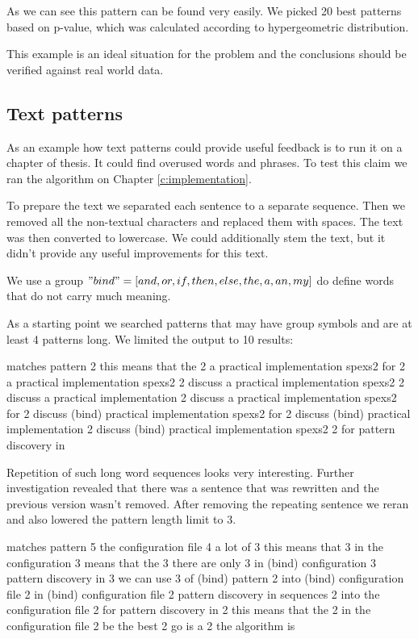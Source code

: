 As we can see this  pattern can be found very easily. We picked 20 best patterns based on p-value, which was calculated according to hypergeometric distribution.

This example is an ideal situation for the problem and the conclusions should be verified against real world data.

\subsection{Text patterns}

As an example how text patterns could provide useful feedback is to run it on a chapter of thesis. It could find overused words and phrases. To test this claim we ran the algorithm on Chapter \ref{c:implementation}.

To prepare the text we separated each sentence to a separate sequence. Then we removed all the non-textual characters and replaced them with spaces. The text was then converted to lowercase. We could additionally stem the text, but it didn't provide any useful improvements for this text.

We use a group $"bind" = [and, or, if, then, else, the, a, an, my]$ do define words that do not carry much meaning.

As a starting point we searched patterns that may have group symbols and are at least 4 patterns long. We limited the output to 10 results:

\begin{file}
matches  pattern
2        this means that the
2        a practical implementation spexs2 for
2        a practical implementation spexs2
2        discuss a practical implementation spexs2
2        discuss a practical implementation
2        discuss a practical implementation spexs2 for
2        discuss (bind) practical implementation spexs2 for
2        discuss (bind) practical implementation
2        discuss (bind) practical implementation spexs2
2        for pattern discovery in
\end{file}

Repetition of such long word sequences looks very interesting. Further investigation revealed that there was a sentence that was rewritten and the previous version wasn't removed. After removing the repeating sentence we reran and also lowered the pattern length limit to 3.

\begin{file}
matches  pattern
5        the configuration file
4        a lot of
3        this means that
3        in the configuration
3        means that the
3        there are only
3        in (bind) configuration
3        pattern discovery in
3        we can use
3        of (bind) pattern
2        into (bind) configuration file
2        in (bind) configuration file
2        pattern discovery in sequences
2        into the configuration file
2        for pattern discovery in
2        this means that the
2        in the configuration file
2        be the best
2        go is a
2        the algorithm is
\end{file}

